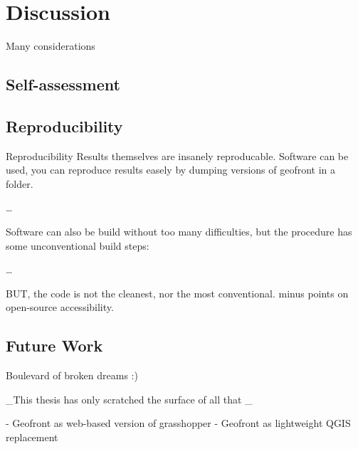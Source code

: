 \chapter{Discussion}%
Many considerations








\section{Self-assessment}


\section{Reproducibility}
Reproducibility
Results themselves are insanely reproducable.
Software can be used, you can reproduce results easely by dumping versions of geofront in 
a folder.

\dots

Software can also be build without too many difficulties, but the procedure has some unconventional build steps: 

\dots

BUT, the code is not the cleanest, nor the most conventional. minus points on open-source accessibility.

\section{Future Work}
Boulevard of broken dreams :) 

_This thesis has only scratched the surface of all that _

- Geofront as web-based version of grasshopper
- Geofront as lightweight QGIS replacement 

